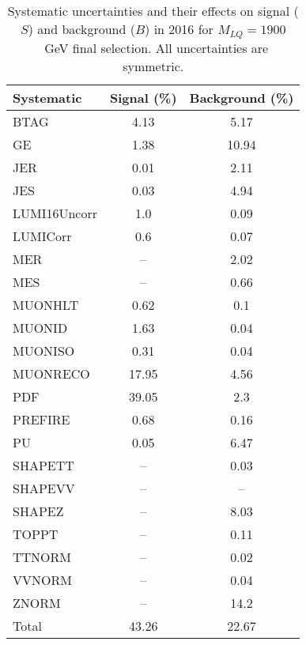 \begin{table}[htbp]
\begin{center}
\caption{Systematic uncertainties and their effects on signal ($S$) and background ($B$) in 2016 for $M_{LQ}=1900$~GeV final selection. All uncertainties are symmetric.}
\begin{tabular}{lcc}
\hline\hline
Systematic & Signal (\%) & Background (\%) \\ \hline 
BTAG & 4.13 & 5.17\\ 
GE & 1.38 & 10.94\\ 
JER & 0.01 & 2.11\\ 
JES & 0.03 & 4.94\\ 
LUMI16Uncorr & 1.0 & 0.09\\ 
LUMICorr & 0.6 & 0.07\\ 
MER & -- & 2.02\\ 
MES & -- & 0.66\\ 
MUONHLT & 0.62 & 0.1\\ 
MUONID & 1.63 & 0.04\\ 
MUONISO & 0.31 & 0.04\\ 
MUONRECO & 17.95 & 4.56\\ 
PDF & 39.05 & 2.3\\ 
PREFIRE & 0.68 & 0.16\\ 
PU & 0.05 & 6.47\\ 
SHAPETT & -- & 0.03\\ 
SHAPEVV & -- & --\\ 
SHAPEZ & -- & 8.03\\ 
TOPPT & -- & 0.11\\ 
TTNORM & -- & 0.02\\ 
VVNORM & -- & 0.04\\ 
ZNORM & -- & 14.2\\ 
Total & 43.26 & 22.67\\ \hline \hline
\end{tabular}
\label{tab:SysUncertainties_uujj_1900}
\end{center}
\end{table}

